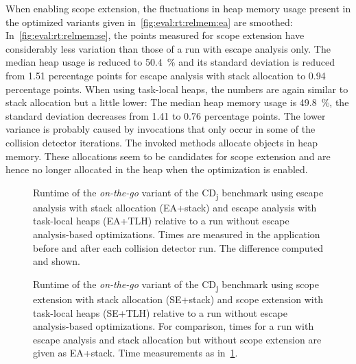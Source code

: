 		When enabling scope extension, the fluctuations in heap memory usage present in the optimized variants given
		in~\cref{fig:eval:rt:relmem:ea} are smoothed: In~\cref{fig:eval:rt:relmem:se}, the points measured for scope
		extension have considerably less variation than those of a run with escape analysis only. The median heap usage is
		reduced to 50.4~\% and its standard deviation is reduced from 1.51 percentage points for escape analysis with stack
		allocation to 0.94 percentage points. When using task-local heaps, the numbers are again similar to stack allocation
		but a little lower: The median heap memory usage is 49.8~\%, the standard deviation decreases from 1.41 to 0.76
		percentage points. The lower variance is probably caused by invocations that only occur in some of the collision
		detector iterations. The invoked methods allocate objects in heap memory. These allocations seem to be candidates
		for scope extension and are hence no longer allocated in the heap when the optimization is enabled.

		\begin{figure}
			\centering
			

			\caption[Relative runtime of \emph{on-the-go} CD\textsubscript{j} with escape analysis]{%
				Runtime of the \emph{on-the-go} variant of the CD\textsubscript{j} benchmark using escape analysis with stack
				allocation (EA+stack) and escape analysis with task-local heaps (EA+TLH) relative to a run without escape
				analysis-based optimizations. Times are measured in the application before and after each collision detector
				run. The difference computed and shown.}
			\label{fig:eval:rt:time:ea}
		\end{figure}

		\begin{figure}
			\centering
			

			\caption[Relative runtime of \emph{on-the-go} CD\textsubscript{j} with scope extension]{%
				Runtime of the \emph{on-the-go} variant of the CD\textsubscript{j} benchmark using scope extension with stack
				allocation (SE+stack) and scope extension with task-local heaps (SE+TLH) relative to a run without escape
				analysis-based optimizations. For comparison, times for a run with escape analysis and stack allocation but
				without scope extension are given as EA+stack. Time measurements as in~\cref{fig:eval:rt:time:ea}.}
			\label{fig:eval:rt:time:se}
		\end{figure}
